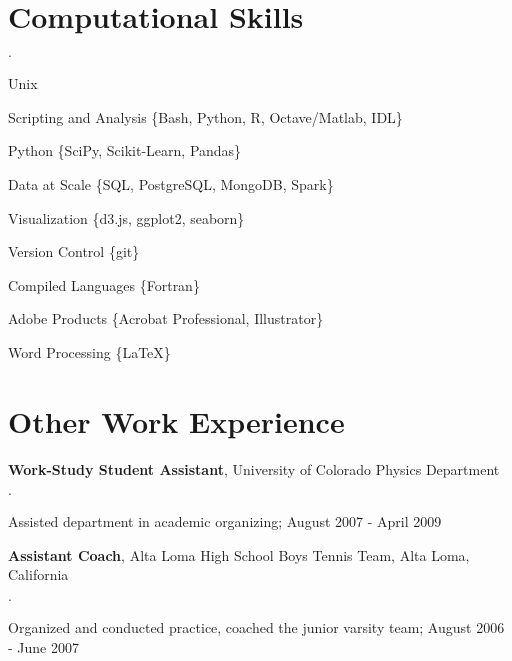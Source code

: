 \documentclass[margin,line]{res}
\newenvironment{list2}{
  \begin{list}{$\cdot$}{%
      \setlength{\itemsep}{0in}
      \setlength{\parsep}{0in} \setlength{\parskip}{0in}
      \setlength{\topsep}{0in} \setlength{\partopsep}{0in} 
      \setlength{\leftmargin}{0.2in}}}{\end{list}}
\newenvironment{list3}{
  \begin{list}{$\cdot$}{%
      \setlength{\itemsep}{0in}
      \setlength{\parsep}{0in} \setlength{\parskip}{0in}
      \setlength{\topsep}{0in} \setlength{\partopsep}{0in} 
      \setlength{\leftmargin}{0.1in}}}{\end{list}}
\begin{document}
\begin{resume}



\section{\sc Computational Skills}

\begin{list3}
\item Unix
\item Scripting and Analysis \{Bash, Python, R, Octave/Matlab, IDL\}
\item Python \{SciPy, Scikit-Learn, Pandas\}
\item Data at Scale \{SQL, PostgreSQL, MongoDB, Spark\}
\item Visualization \{d3.js, ggplot2, seaborn\}
\item Version Control \{git\}
\item Compiled Languages \{Fortran\}
\item Adobe Products \{Acrobat Professional, Illustrator\}
\item Word Processing \{\LaTeX\}
\end{list3}


\section{\sc Other Work Experience}

{\bf Work-Study Student Assistant}, University of Colorado Physics Department
\begin{list2}
\item Assisted department in academic organizing; August 2007 - April 2009
\end{list2}

{\bf Assistant Coach}, Alta Loma High School Boys Tennis Team, Alta Loma, California
\begin{list2}
\item Organized and conducted practice, coached the junior varsity team; August 2006 - June 2007
\end{list2}


\end{resume}
\end{document}
